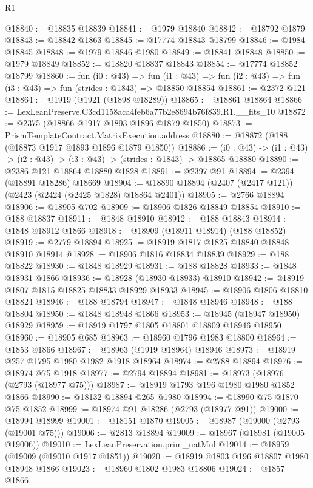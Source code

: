 \begin{lexlean}{R1}
\begin{coremodule}
@18840 := @18835 @18839
@18841 := @1979 @18840
@18842 := @18792 @1879
@18843 := @18842 @1863
@18845 := @17774 @18843 @18799
@18846 := @1984 @18845
@18848 := @1979 @18846 @1980
@18849 := @18841 @18848
@18850 := @1979 @18849
@18852 := @18820 @18837 @18843
@18854 := @17774 @18852 @18799
@18860 := fun (i0 : @43) =>
  fun (i1 : @43) => fun (i2 : @43) => fun (i3 : @43) => fun (strides : @1843) => @18850 @18854
@18861 := @2372 @121
@18864 := @1919 (@1921 (@1898 @18289))
@18865 := @18861 @18864
@18866 := LexLeanPreserve.C3cd1158aca4feb6a77b2e8694b76f839.R1.__fits_10
@18872 := @2375 (@18866 @1917 @1893 @1896 @1879 @1850)
@18873 := PrismTemplateContract.MatrixExecution.address
@18880 := @18872 (@188 (@18873 @1917 @1893 @1896 @1879 @1850))
@18886 := (i0 : @43) -> (i1 : @43) -> (i2 : @43) -> (i3 : @43) -> (strides : @1843) -> @18865 @18880
@18890 := @2386 @121 @18864 @18880 @1828
@18891 := @2397 @91
@18894 := @2394 (@18891 @18286) @18669
@18904 := @18890 @18894 (@2407 (@2417 @121)) (@2423 (@2424 (@2425 @1828) @18864 @2401))
@18905 := @2766 @18894
@18906 := @18905 @702
@18909 := @18906 @1826 @18849 @18854
@18910 := @188 @18837
@18911 := @1848 @18910
@18912 := @188 @18843
@18914 := @1848 @18912 @1866
@18918 := @18909 (@18911 @18914) (@188 @18852)
@18919 := @2779 @18894
@18925 := @18919 @1817 @1825 @18840 @18848 @18910 @18914
@18928 := @18906 @1816 @18834 @18839
@18929 := @188 @18822
@18930 := @1848 @18929
@18931 := @188 @18828
@18933 := @1848 @18931 @1866
@18936 := @18928 (@18930 @18933) @18910
@18942 := @18919 @1807 @1815 @18825 @18833 @18929 @18933
@18945 := @18906 @1806 @18810 @18824
@18946 := @188 @18794
@18947 := @1848 @18946
@18948 := @188 @18804
@18950 := @1848 @18948 @1866
@18953 := @18945 (@18947 @18950) @18929
@18959 := @18919 @1797 @1805 @18801 @18809 @18946 @18950
@18960 := @18905 @685
@18963 := @18960 @1796 @1983 @18800
@18964 := @1853 @1866
@18967 := @18963 (@1919 @18964) @18946
@18973 := @18919 @257 @1795 @1980 @1982 @1918 @18964
@18974 := @2788 @18894
@18976 := @18974 @75 @1918
@18977 := @2794 @18894
@18981 := @18973 (@18976 (@2793 (@18977 @75)))
@18987 := @18919 @1793 @196 @1980 @1980 @1852 @1866
@18990 := @18132 @18894 @265 @1980
@18994 := @18990 @75 @1870 @75 @1852
@18999 := @18974 @91 @18286 (@2793 (@18977 @91))
@19000 := @18994 @18999
@19001 := @18151 @1870
@19005 := @18987 (@19000 (@2793 (@19001 @75)))
@19006 := @2813 @18894
@19009 := @18967 (@18981 (@19005 @19006))
@19010 := LexLeanPreservation.prim_natMul
@19014 := @18959 (@19009 (@19010 @1917 @1851))
@19020 := @18919 @1803 @196 @18807 @1980 @18948 @1866
@19023 := @18960 @1802 @1983 @18806
@19024 := @1857 @1866

\end{coremodule}
\end{lexlean}
